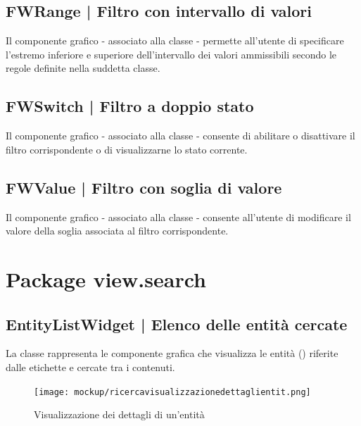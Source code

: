 \documentclass[10pt,a4paper,headinclude,footinclude,hidelinks]{scrreprt} %
\begin{document}
	\subsection[FWRange]{FWRange | Filtro con intervallo di valori}
	\label{sec:stage:design:sistema:view.filter:range-filter}
	Il componente grafico - associato alla classe \textit{} - permette all'utente di specificare l'estremo inferiore e superiore dell'intervallo dei valori ammissibili secondo le regole definite nella suddetta classe.

	\subsection[FWSwitch]{FWSwitch | Filtro a doppio stato}
	\label{sec:stage:design:sistema:view.filter:switch-filter}
	Il componente grafico - associato alla classe \textit{} - consente di abilitare o disattivare il filtro corrispondente o di visualizzarne lo stato corrente.

	\subsection[FWValue]{FWValue | Filtro con soglia di valore}
	\label{sec:stage:design:sistema:view.filter:value-filter}
	Il componente grafico - associato alla classe \textit{} - consente all'utente di modificare il valore della soglia associata al filtro corrispondente.

	\section{Package view.search}
	\label{sec:stage:design:sistema:view.search}

	\subsection[EntityListWidget]{EntityListWidget | Elenco delle entità cercate}
	\label{sec:stage:design:sistema:view.search:search-entity-list}
	La classe \textit{} rappresenta le componente grafica che visualizza le entità (\textit{}) riferite dalle etichette e cercate tra i contenuti.

	\begin{figure}[ht]
		\begin{center}
	    	\texttt{[image: mockup/ricercavisualizzazionedettaglientit.png]}
			\label{gfx:mockup:entity-list}
			\caption{Visualizzazione dei dettagli di un'entità}
		\end{center}
	\end{figure}
\end{document}
